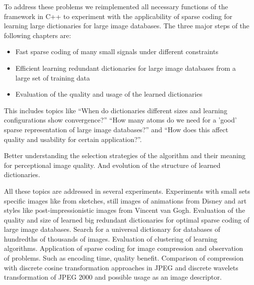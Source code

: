 To address these problems we reimplemented all necessary functions of the
framework in C++ to experiment with the applicability of sparse coding for
learning large dictionaries for large image databases. The three major steps of
the following chapters are:

\begin{itemize}
 \item Fast sparse coding of many small signals under different constraints
 \item Efficient learning redundant dictionaries for large image databases from
a large set of training data
 \item Evaluation of the quality and usage of the learned dictionaries
\end{itemize}

This includes topics like ``When do dictionaries different sizes and
learning configurations show convergence?'' ``How many atoms do we need for a
'good' sparse representation of large image databases?''  and ``How does this
affect quality and usability for certain application?''. 

Better understanding the selection strategies of the algorithm and their
meaning for perceptional image quality. And evolution of the structure of
learned dictionaries. 

All these topics are addressed in several experiments. Experiments with
small sets specific images like from sketches, still images of animations from
Disney and art styles like post-impressionistic images from Vincent van Gogh.
Evaluation of the quality and size of learned big redundant dictionaries for
optimal sparse coding of large image databases. Search for a universal
dictionary for databases of hundredths of thousands of images. Evaluation of
clustering of learning algorithms. Application of sparse coding for image
compression and observation of problems. Such as encoding time, quality benefit.
Comparison of compression with discrete cosine transformation approaches in JPEG
and discrete wavelets transformation of JPEG 2000 and possible usage as an image
descriptor.








